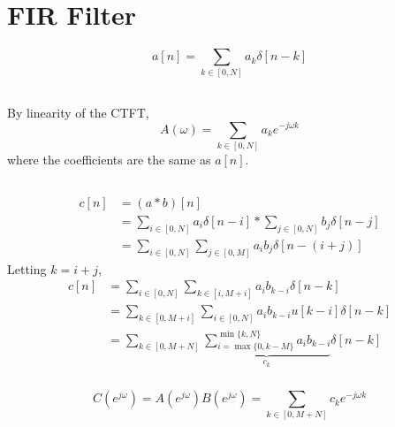 \documentclass{article}
\begin{document}
\section{FIR Filter}

\begin{equation}
    a[n] = \sum_{k \in [0, N]} a_k \delta[n - k]
\end{equation}

\subsection{}

By linearity of the CTFT,
\begin{equation}
    A(\omega) = \sum_{k \in [0, N]} a_k e^{-j \omega k}
\end{equation}
where the coefficients are the same as \(a[n]\).

\subsection{}

\subsubsection{}

\begin{align}
    c[n] &= (a \ast b)[n] \\
    &= \sum_{i \in [0, N]} a_i \delta[n - i] \ast \sum_{j \in [0, N]} b_j \delta[n - j] \\
    &= \sum_{i \in [0, N]} \sum_{j \in [0, M]} a_i b_j \delta[n - (i + j)]
\end{align}
Letting \(k = i + j\),
\begin{align}
    c[n] &= \sum_{i \in [0, N]} \sum_{k \in [i, M + i]} a_i b_{k - i} \delta[n - k] \\
    &= \sum_{k \in [0, M + i]} \sum_{i \in [0, N]} a_i b_{k - i} u[k - i] \delta[n - k] \\
    &= \sum_{k \in [0, M + N]} \underbrace{\sum_{i = \max\{0, k - M\}}^{\min\{k, N\}} a_i b_{k - i}}_{c_k} \delta[n - k]
\end{align}

\subsubsection{}

\begin{equation}
    C(e^{j \omega}) = A(e^{j \omega}) B(e^{j \omega}) = \sum_{k \in [0, M + N]} c_k e^{-j \omega k}
\end{equation}
\end{document}
